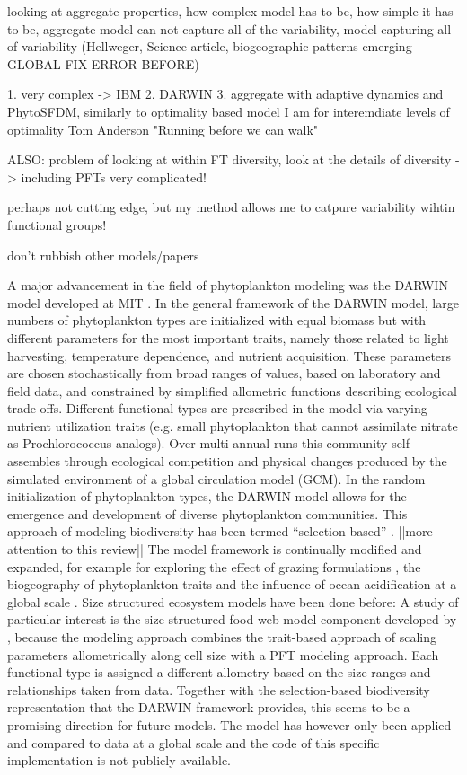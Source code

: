 looking at aggregate properties, how complex model has to be, how simple it has to be, aggregate model can not capture all of the variability, model capturing all of variability (Hellweger, Science article, biogeographic patterns emerging - GLOBAL FIX ERROR BEFORE)

1. very complex -> IBM
2. DARWIN
3. aggregate with adaptive dynamics and PhytoSFDM, similarly to optimality based model
I am for interemdiate levels of optimality
Tom Anderson "Running before we can walk"

ALSO: problem of looking at within FT diversity, look at the details of diversity -> including PFTs very complicated!

perhaps not cutting edge, but my method allows me to catpure variability wihtin functional groups!

don't rubbish other models/papers

A major advancement in the field of phytoplankton modeling was the DARWIN model developed at MIT \citep{Follows2007d}. In the general framework of the DARWIN model, large numbers of phytoplankton types are initialized with equal biomass but with different parameters for the most important traits, namely those related to light harvesting, temperature dependence, and nutrient acquisition. These parameters are chosen stochastically from broad ranges of values, based on laboratory and field data, and constrained by simplified allometric functions describing ecological trade-offs. Different functional types are prescribed in the model via varying nutrient utilization traits (e.g. small phytoplankton that cannot assimilate nitrate as Prochlorococcus analogs). Over multi-annual runs this community self-assembles through ecological competition and physical changes produced by the simulated environment of a global circulation model (GCM). In the random initialization of phytoplankton types, the DARWIN model allows for the emergence and development of diverse phytoplankton communities. This approach of modeling biodiversity has been termed “selection-based” \citep{Follows2011c}. ||more attention to this review|| The model framework is continually modified and expanded, for example for exploring the effect of grazing formulations \citep{Prowe2012c}, the biogeography of phytoplankton traits \citep{Barton2013} and the influence of ocean acidification at a global scale \citep{Dutkiewicz2015}. 
Size structured ecosystem models have been done before: \citep{Baird2007b}
A study of particular interest is the size-structured food-web model component developed by \citet{Ward2012}, because the modeling approach combines the trait-based approach of scaling parameters allometrically along cell size with a PFT modeling approach. Each functional type is assigned a different allometry based on the size ranges and relationships taken from data. Together with the selection-based biodiversity representation that the DARWIN framework provides, this seems to be a promising direction for future models. The model has however only been applied and compared to data at a global scale and the code of this specific implementation is not publicly available.

